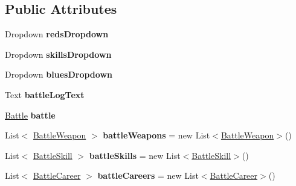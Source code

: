 \subsection*{Public Attributes}
\begin{DoxyCompactItemize}
\item 
Dropdown {\bfseries reds\+Dropdown}\hypertarget{classdoki_battle_1_1_battle_manager_a72d492cb169fb3e07753793153e2f236}{}\label{classdoki_battle_1_1_battle_manager_a72d492cb169fb3e07753793153e2f236}

\item 
Dropdown {\bfseries skills\+Dropdown}\hypertarget{classdoki_battle_1_1_battle_manager_ada8012e06e0fe3b821e7ad65cc65fe76}{}\label{classdoki_battle_1_1_battle_manager_ada8012e06e0fe3b821e7ad65cc65fe76}

\item 
Dropdown {\bfseries blues\+Dropdown}\hypertarget{classdoki_battle_1_1_battle_manager_a75d3feb47a08cf349060dff825bb62d2}{}\label{classdoki_battle_1_1_battle_manager_a75d3feb47a08cf349060dff825bb62d2}

\item 
Text {\bfseries battle\+Log\+Text}\hypertarget{classdoki_battle_1_1_battle_manager_a2f8bf2fd3455396175283f31ce8fd43b}{}\label{classdoki_battle_1_1_battle_manager_a2f8bf2fd3455396175283f31ce8fd43b}

\item 
\hyperlink{classdoki_battle_1_1_battle}{Battle} {\bfseries battle}\hypertarget{classdoki_battle_1_1_battle_manager_adb921b088b6fd843bafb5e0f3ce4ccd6}{}\label{classdoki_battle_1_1_battle_manager_adb921b088b6fd843bafb5e0f3ce4ccd6}

\item 
List$<$ \hyperlink{classdoki_battle_1_1_battle_weapon}{Battle\+Weapon} $>$ {\bfseries battle\+Weapons} = new List$<$\hyperlink{classdoki_battle_1_1_battle_weapon}{Battle\+Weapon}$>$()\hypertarget{classdoki_battle_1_1_battle_manager_ab9c032d40853611858399a5095e77e8d}{}\label{classdoki_battle_1_1_battle_manager_ab9c032d40853611858399a5095e77e8d}

\item 
List$<$ \hyperlink{classdoki_battle_1_1_battle_skill}{Battle\+Skill} $>$ {\bfseries battle\+Skills} = new List$<$\hyperlink{classdoki_battle_1_1_battle_skill}{Battle\+Skill}$>$()\hypertarget{classdoki_battle_1_1_battle_manager_a66de0032c155d1fb56206a712d5c79f6}{}\label{classdoki_battle_1_1_battle_manager_a66de0032c155d1fb56206a712d5c79f6}

\item 
List$<$ \hyperlink{classdoki_battle_1_1_battle_career}{Battle\+Career} $>$ {\bfseries battle\+Careers} = new List$<$\hyperlink{classdoki_battle_1_1_battle_career}{Battle\+Career}$>$()\hypertarget{classdoki_battle_1_1_battle_manager_af17eb7f84227911279f1359c2b40a87f}{}\label{classdoki_battle_1_1_battle_manager_af17eb7f84227911279f1359c2b40a87f}


\end{DoxyCompactItemize}
